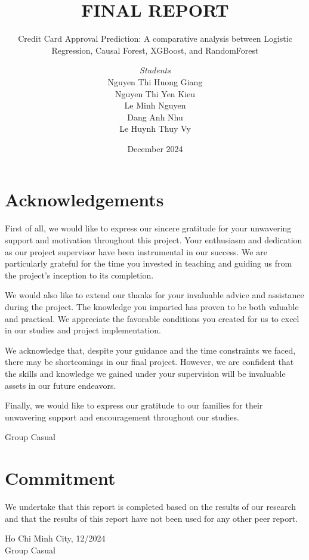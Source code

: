 \documentclass[12pt]{report}
\institute{University of Economics and Law}
\title{FINAL REPORT}
\subtitle{Credit Card Approval Prediction: A comparative analysis between Logistic Regression, Causal Forest, XGBoost, and RandomForest}
\author{\textit{Students}\\Nguyen Thi Huong Giang\\Nguyen Thi Yen Kieu\\Le Minh Nguyen\\Dang Anh Nhu\\Le Huynh Thuy Vy}
\date{December 2024}
\begin{document}
    \maketitle

    \chapter*{Acknowledgements}
    First of all, we would like to express our sincere gratitude for your unwavering support and motivation throughout this project. Your enthusiasm and dedication as our project supervisor have been instrumental in our success. We are particularly grateful for the time you invested in teaching and guiding us from the project's inception to its completion.
    
    We would also like to extend our thanks for your invaluable advice and assistance during the project. The knowledge you imparted has proven to be both valuable and practical. We appreciate the favorable conditions you created for us to excel in our studies and project implementation.
    
    We acknowledge that, despite your guidance and the time constraints we faced, there may be shortcomings in our final project. However, we are confident that the skills and knowledge we gained under your supervision will be invaluable assets in our future endeavors.
    
    Finally, we would like to express our gratitude to our families for their unwavering support and encouragement throughout our studies.
    
    \begin{flushright}
        Group Casual
    \end{flushright}

    \chapter*{Commitment}
    We undertake that this report is completed based on the results of our research and that the results of this report have not been used for any other peer report.

    \begin{flushright}
        Ho Chi Minh City, 12/2024\\
        Group Casual
    \end{flushright}
\end{document}
